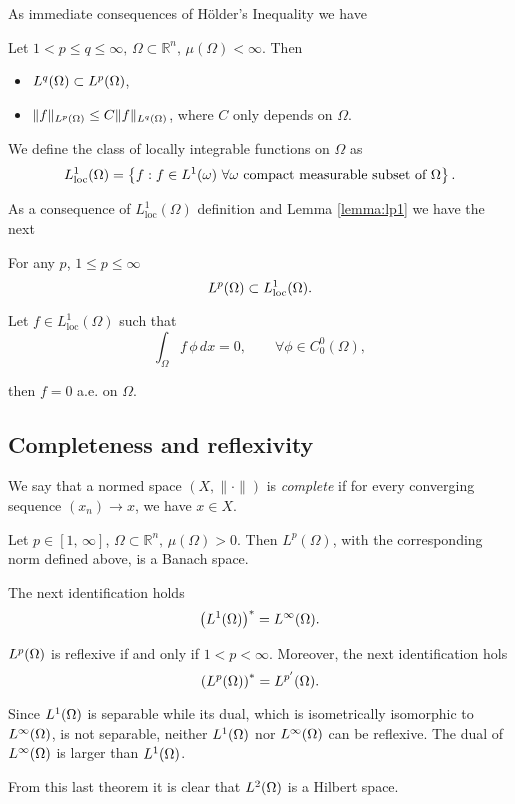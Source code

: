 As immediate consequences of H\"older's Inequality we have
\begin{lemma}\label{lemma:lp1}
Let $1<p\leq q\leq \infty,\,\Omega\subset \mathbb{R}^n,\,\mu(\Omega)<\infty$. Then
\begin{itemize}
\item ${L^{q}(\Omega)}\subset {L^{p}(\Omega)}$,
\item $\|f\|_{L^{p}(\Omega)}\leq C \|f\|_{L^{q}(\Omega)}$, where $C$ only depends on $\Omega$.
\end{itemize}
\end{lemma}
\begin{definition} We define the class of locally integrable functions on $\Omega$ as $$L_\text{loc}^1(\Omega)=\left\{f:f\in {L^{1}(\omega)}\,\, \forall \omega \text{ compact measurable subset of }\Omega\right\}.$$
\end{definition}
As a consequence of $L_\text{loc}^1(\Omega)$ definition and Lemma \ref{lemma:lp1} we have the next
\begin{lemma} For any $p$, $1\leq p \leq \infty$ $${L^{p}(\Omega)} \subset L^1_\text{loc}(\Omega).$$
\end{lemma}
\begin{lemma}\label{lemma:L1loc}Let $f\in L^1_\text{loc}(\Omega)$ such that $$\int_\Omega f\,\phi\,dx = 0,\qquad \forall \phi\in C_0^0(\Omega),$$
\end{lemma}
then $f=0$ a.e. on $\Omega$.
\subsection*{Completeness and reflexivity}
We say that a normed space $(X,\|\cdot\|)$ is \emph{complete} if for every converging sequence $(x_n)\rightarrow x$, we have $x\in X$.
\begin{theorem}Let $p\in [1,\,\infty]$, $\Omega\subset \mathbb{R}^n,\,\mu(\Omega)>0$. Then $L^p(\Omega)$, with the corresponding norm defined above, is a Banach space.
\end{theorem}
\begin{theorem} The next identification holds
$$\left({L^{1}(\Omega)}\right)^*={L^{\infty}(\Omega)}.$$
\end{theorem}
\begin{theorem}
${L^{p}(\Omega)}$ is reflexive if and only if $1<p<\infty$. Moreover, the next identification hols $$\left({L^{p}(\Omega)}\right)^*={L^{p'}(\Omega)}.$$
\end{theorem}
\begin{remark}
Since ${L^{1}(\Omega)}$ is separable while its dual, which is isometrically isomorphic to ${L^{\infty}(\Omega)}$, is not separable, neither ${L^{1}(\Omega)}$ nor ${L^{\infty}(\Omega)}$ can be reflexive. The dual of ${L^{\infty}(\Omega)}$ is larger than ${L^{1}(\Omega)}$.
\end{remark}
\begin{remark}
From this last theorem it is clear that ${L^{2}(\Omega)}$ is a Hilbert space.
\end{remark}

